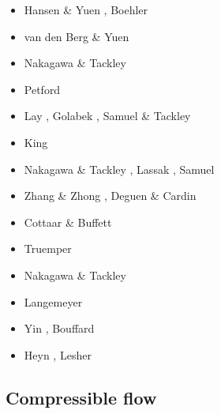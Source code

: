 \begin{scriptsize}
\begin{itemize}
\item[\nineteenninetysix] Hansen \& Yuen \cite{hayu96}, Boehler \cite{boeh96}
\item[\nineteenninetyeight] van den Berg \& Yuen \cite{vayu98}
\item[\twothousandfour] Nakagawa \& Tackley \cite{nata04c}
\item[\twothousandseven] Petford \etal \cite{pery07}
\item[\twothousandeight] Lay \etal \cite{lahb08}, Golabek \etal \cite{gost08}, Samuel \& Tackley \cite{sata08}
\item[\twothousandnine] King \etal \cite{kisn09}\\
\item[\twothousandten] Nakagawa \& Tackley \cite{nata10}, Lassak \etal \cite{lamg10}, 
                       Samuel \etal \cite{sate10}
\item[\twothousandeleven] Zhang \& Zhong  \cite{zhzh11}, Deguen \& Cardin \cite{deca11}
\item[\twothousandtwelve] Cottaar \& Buffett  \cite{cobu12}
\item[\twothousandtwelve] Truemper \etal  \cite{trbh12}
\item[\twothousandthirteen] Nakagawa \& Tackley  \cite{nata13}
\item[\twothousandeighteen] Langemeyer \etal  \cite{lalt18}
\item[\twothousandnineteen] Yin \etal  \cite{yiym19}, Bouffard \etal \cite{bocl19}
\item[\twothousandtwenty] Heyn \etal \cite{hect20}, Lesher \etal \cite{ledb20}
\end{itemize}
\end{scriptsize}

\subsection{Compressible flow}

